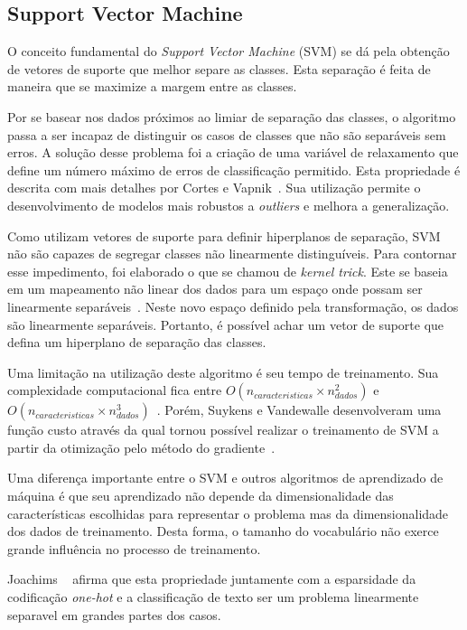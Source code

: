 \subsection{Support Vector Machine}

O conceito fundamental do \textit{Support Vector Machine} (SVM) se dá pela obtenção de vetores de suporte que melhor
separe as classes.
Esta separação é feita de maneira que se maximize a margem entre as classes.

Por se basear nos dados próximos ao limiar de separação das classes, o algoritmo passa a ser incapaz de distinguir os
casos de classes que não são separáveis sem erros.
A solução desse problema foi a criação de uma variável de relaxamento que define um número máximo de erros de
classificação permitido.
Esta propriedade é descrita com mais detalhes por Cortes e Vapnik~\cite{cortes95}.
Sua utilização permite o desenvolvimento de modelos mais robustos a \textit{outliers} e melhora a generalização.

Como utilizam vetores de suporte para definir hiperplanos de separação, SVM não são capazes de segregar classes não
linearmente distinguíveis.
Para contornar esse impedimento, foi elaborado o que se chamou de \textit{kernel trick}.
Este se baseia em um mapeamento não linear dos dados para um espaço onde possam ser linearmente
separáveis~\cite{scholkopf02}.
Neste novo espaço definido pela transformação, os dados são linearmente separáveis.
Portanto, é possível achar um vetor de suporte que defina um hiperplano de separação das classes.

Uma limitação na utilização deste algoritmo é seu tempo de treinamento. Sua complexidade computacional fica entre
$O(n_{caracteristicas} \times n_{dados}^2)$ e $O(n_{caracteristicas} \times n_{dados}^3)$~\cite{list09}.
Porém, Suykens e Vandewalle desenvolveram uma função custo através da qual tornou possível realizar o treinamento de SVM
a partir da otimização pelo método do gradiente~\cite{suykens99}.

Uma diferença importante entre o SVM e outros algoritmos de aprendizado de máquina é que seu aprendizado não depende
da dimensionalidade das características escolhidas para representar o problema mas da dimensionalidade dos dados de
treinamento.
Desta forma, o tamanho do vocabulário não exerce grande influência no processo de treinamento.

Joachims ~\cite{joachims98} afirma que esta propriedade juntamente com a esparsidade da codificação \textit{one-hot}
e a classificação de texto ser um problema linearmente separavel em grandes partes dos casos.

